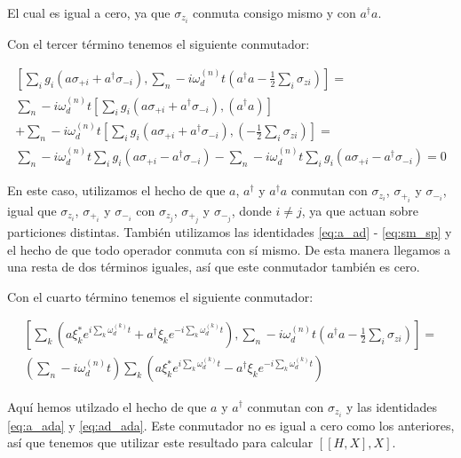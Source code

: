 El cual es igual a cero, ya que $\sigma_{z_i}$ conmuta consigo mismo y con $a^\dagger a$.

Con el tercer término tenemos el siguiente conmutador:

\begin{multline}
\left[\sum\limits_i g_i (a \sigma_{+ i} + a^\dagger \sigma_{- i}), \sum\limits_n-i \omega_d^{(n)} t(a^\dagger a - \frac{1}{2} \sum\limits_i \sigma_{z i})\right] = \\
\sum\limits_n-i \omega_d^{(n)} t \left[\sum\limits_i g_i (a \sigma_{+ i} + a^\dagger \sigma_{- i}), (a^\dagger a)\right] \\
+ \sum\limits_n-i \omega_d^{(n)} t \left[\sum\limits_i g_i (a \sigma_{+ i} + a^\dagger \sigma_{- i}), (- \frac{1}{2} \sum\limits_i \sigma_{z i})\right] = \\
\sum\limits_n-i \omega_d^{(n)} t \sum\limits_i g_i (a \sigma_{+ i} - a^\dagger \sigma_{- i})
- \sum\limits_n-i \omega_d^{(n)} t \sum\limits_i g_i (a \sigma_{+ i} - a^\dagger \sigma_{- i}) = 0
\end{multline}

En este caso, utilizamos el hecho de que $a$, $a^\dagger$ y $a^\dagger a$ conmutan con $\sigma_{z_i}$, $\sigma_{+_i}$ y $\sigma_{-_i}$, igual que $\sigma_{z_i}$, $\sigma_{+_i}$ y $\sigma_{-_i}$ con $\sigma_{z_j}$, $\sigma_{+_j}$ y $\sigma_{-_j}$, donde $i \neq j$, ya que actuan sobre particiones distintas. También utilizamos las identidades \ref{eq:a_ad} - \ref{eq:sm_sp} y el hecho de que todo operador conmuta con sí mismo. De esta manera llegamos a una resta de dos términos iguales, así que este conmutador también es cero.

Con el cuarto término tenemos el siguiente conmutador:

\begin{multline}
    \left[\sum\limits_k \left(a\xi_k^*e^{i\sum\limits_k \omega_d^{(k)}t}+ a^\dagger\xi_ke^{-i\sum\limits_k \omega_d^{(k)}t}\right), \sum\limits_n-i \omega_d^{(n)} t\left(a^\dagger a - \frac{1}{2} \sum\limits_i \sigma_{z i}\right)\right] = \\
    \left(\sum\limits_n-i \omega_d^{(n)} t\right) \sum\limits_k \left(a\xi_k^*e^{i\sum\limits_k \omega_d^{(k)}t} - a^\dagger\xi_ke^{-i\sum\limits_k \omega_d^{(k)}t}\right)
\end{multline}

Aquí hemos utilzado el hecho de que $a$ y $a^\dagger$ conmutan con $\sigma_{z_i}$ y las identidades \ref{eq:a_ada} y \ref{eq:ad_ada}. Este conmutador no es igual a cero como los anteriores, así que tenemos que utilizar este resultado para calcular $[[H,X],X]$.

